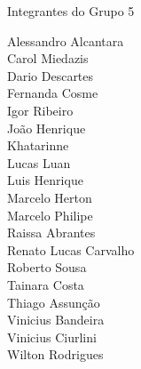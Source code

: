 \begin{folhadeaprovacao}

  \begin{center}
    {\ABNTEXchapterfont\large\imprimirautor}

    \vspace*{\fill}\vspace*{\fill}
    {\ABNTEXchapterfont\bfseries\Large\imprimirtitulo}
    \vspace*{\fill}

    Integrantes do Grupo 5

   \end{center}
   Alessandro Alcantara\\
   Carol Miedazis\\
   Dario Descartes\\
   Fernanda Cosme\\
   Igor Ribeiro\\
   João Henrique\\
   Khatarinne\\
   Lucas Luan\\
   Luis Henrique\\
   Marcelo Herton\\
   Marcelo Philipe\\
   Raissa Abrantes\\
   Renato Lucas Carvalho\\
   Roberto Sousa\\
   Tainara Costa\\
   Thiago Assunção\\
   Vinicius Bandeira\\
   Vinicius Ciurlini\\
   Wilton Rodrigues\\

\end{folhadeaprovacao}
